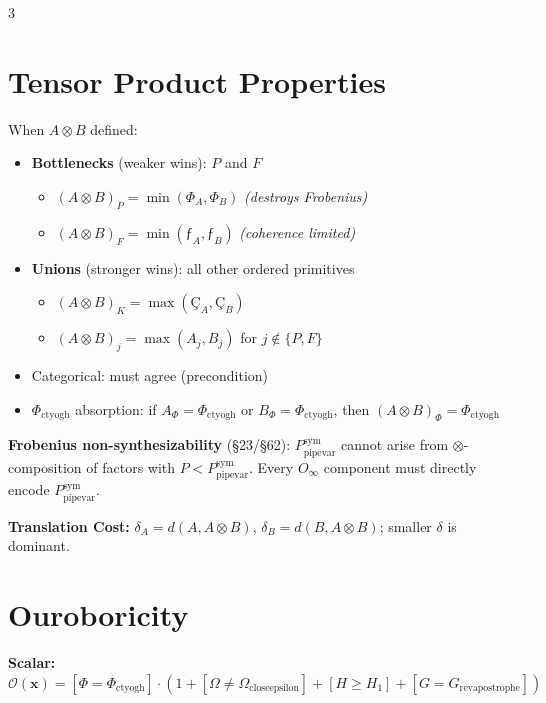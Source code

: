 \documentclass[8pt,a4paper,landscape]{article}
\begin{document}
\begin{multicols}{3}
\section*{Tensor Product Properties}
\footnotesize
When $A\otimes B$ defined:
\begin{itemize}[leftmargin=*,nosep,topsep=4pt,itemsep=2pt]
\item \textbf{Bottlenecks} (weaker wins): $P$ and $F$
  \begin{itemize}[nosep,label={--}]
  \item $(A\otimes B)_P = \min(Φ_A, Φ_B)$ \quad\textit{(destroys Frobenius)}
  \item $(A\otimes B)_F = \min(ƒ_A, ƒ_B)$ \quad\textit{(coherence limited)}
  \end{itemize}
\item \textbf{Unions} (stronger wins): all other ordered primitives
  \begin{itemize}[nosep,label={--}]
  \item $(A\otimes B)_K = \max(Ç_A, Ç_B)$
  \item $(A\otimes B)_j = \max(A_j, B_j)$ for $j\notin\{P,F\}$
  \end{itemize}
\item Categorical: must agree (precondition)
\item $\Phi_{\text{ctyogh}}$ absorption: if $A_\Phi{=}\Phi_{\text{ctyogh}}$ or $B_\Phi{=}\Phi_{\text{ctyogh}}$, then $(A\otimes B)_\Phi{=}\Phi_{\text{ctyogh}}$
\end{itemize}
\textbf{Frobenius non-synthesizability} (\S23/\S62): $P_{\text{pipevar}}^{\text{sym}}$ cannot arise from $\otimes$-composition of factors with $P<P_{\text{pipevar}}^{\text{sym}}$. Every $O_\infty$ component must directly encode $P_{\text{pipevar}}^{\text{sym}}$.

\textbf{Translation Cost:} $\delta_A=d(A,A\otimes B)$, $\delta_B=d(B,A\otimes B)$; smaller $\delta$ is dominant.

\section*{Ouroboricity}
\footnotesize
\textbf{Scalar:} $\mathcal{O}(\mathbf{x})=[\Phi{=}\Phi_{\text{ctyogh}}]\cdot(1+[\Omega{\neq}\Omega_{\text{closeepsilon}}]+[H{\ge}H_1]+[G{=}G_{\text{revapostrophe}}])$


\end{multicols}
\end{document}
